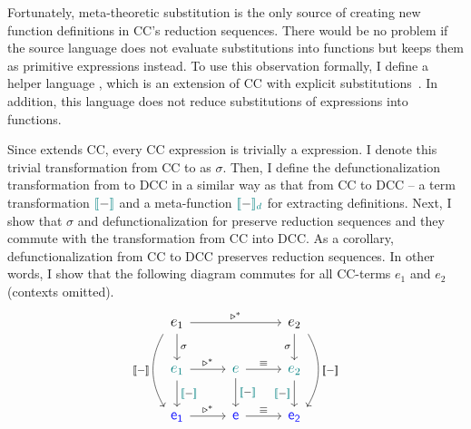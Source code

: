 Fortunately, meta-theoretic substitution is the only source of creating new function definitions in CC's reduction sequences. There would be no problem if the source language does not evaluate substitutions into functions but keeps them as primitive expressions instead. To use this observation formally, I define a helper language {\ccs}, which is an extension of CC with explicit substitutions~\cite{DBLP:journals/jfp/AbadiCCL91}. In addition, this language does not reduce substitutions of expressions into functions.

Since {\ccs} extends CC, every CC expression is trivially a {\ccs} expression. I denote this trivial transformation from CC to {\ccs} as $\sigma$. Then, I define the defunctionalization transformation from {\ccs} to DCC in a similar way as that from CC to DCC -- a term transformation $\color{teal}{[\![}\color{black}{-}\color{teal}{]\!]}\color{black}$ and a meta-function $\color{teal}{[\![}\color{black}{-}\color{teal}{]\!]_d}\color{black}$ for extracting definitions. Next, I show that $\sigma$ and defunctionalization for {\ccs} preserve reduction sequences and they commute with the transformation from CC into DCC. As a corollary, defunctionalization from CC to DCC preserves reduction sequences. In other words, I show that the following diagram commutes for all CC-terms $e_1$ and $e_2$ (contexts omitted).
\begin{equation}
\label{the graph}
\large
\begin{tikzcd}
e_1 \arrow[d, "\sigma"] \arrow[dd, "\bbracket{-}"', bend right, shift right=2] \arrow[rr, "\triangleright^*"] &                                               & e_2 \arrow[d, "\sigma"'] \arrow[dd, "\bbracket{-}", bend left, shift left=2] \\
\helper{e_1} \arrow[r, "\triangleright^*"] \arrow[d, "\hbracket{-}"]                                           & \helper{e} \arrow[r, "\equiv"] \arrow[d, "\hbracket{-}"] & \helper{e_2} \arrow[d, "\hbracket{-}"']                                       \\
\target{e_1} \arrow[r, "\triangleright^*"]                                                                    & \target{e} \arrow[r, "\equiv"]                & \target{e_2}                                                                
\end{tikzcd}
\normalsize
\vspace{0.5cm}
\end{equation}
